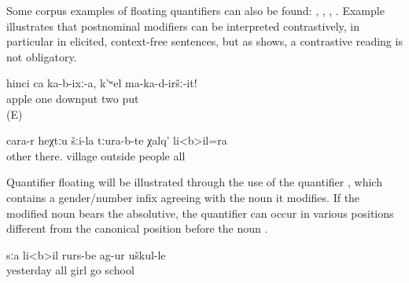Some corpus examples of floating quantifiers can also be found: , , , . Example  illustrates that postnominal modifiers can be interpreted contrastively, in particular in elicited, context-free sentences, but as  shows, a contrastive reading is not obligatory. 

\begin{exe}
		\ex	\label{ex:‎‎‎Put one apple (there), do not put two (apples)}
	\gll	hinci	ca	ka-b-ixː-a,	k'ʷel	ma-ka-d-iršː-it!\\
		apple	one	downput	two	put\\
	\glt	{} (E)
	
	\ex	\label{ex:and all the people from the other villages down there}
	\gll	cara-r	heχtːu	šːi-la	tːura-b-te	χalq'	li<b>il=ra\\
		other	there.	village	outside 	people	all\\
	\glt	{}
	
\end{exe}

Quantifier floating will be illustrated through the use of the quantifier , which contains a gender/number infix agreeing with the noun it modifies. If the modified noun bears the absolutive, the quantifier can occur in various positions different from the canonical position before the noun . 


%
\begin{exe}
	\ex	\label{ex:Yesterday all girls went to school}
	\begin{xlist}
		\ex	\label{ex:Yesterday all girls went to school@A}
		\gll	sːa	li<b>il	rurs-be	ag-ur	uškul-le\\
			yesterday	all	girl	go	school\\
		\glt	{}

		\ex	{}	\label{ex:Yesterday all girls went to school@B}

		\ex	{}	\label{ex:Yesterday all girls went to school@C}

		\ex	{}	\label{ex:Yesterday all girls went to school@D}

	\end{xlist}
\end{exe}

